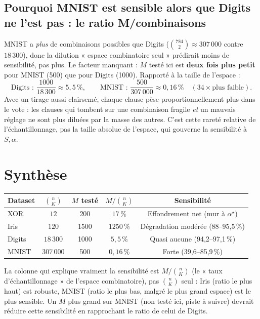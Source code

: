 \documentclass[12pt,a4paper]{article}
\theoremstyle{remark}
\begin{document}
\subsection{Pourquoi MNIST est sensible alors que Digits ne l'est pas : le ratio M/combinaisons}

MNIST a \emph{plus} de combinaisons possibles que Digits
($\binom{784}{2}\approx307\,000$ contre $18\,300$), donc la dilution
« espace combinatoire seul » prédirait moins de sensibilité, pas plus. Le
facteur manquant : $M$ testé ici est \textbf{deux fois plus petit} pour MNIST
(500) que pour Digits (1000). Rapporté à la taille de l'espace :
\[
  \text{Digits : } \frac{1000}{18\,300}\approx5{,}5\,\%,
  \qquad
  \text{MNIST : } \frac{500}{307\,000}\approx0{,}16\,\% \quad (34\times\text{plus faible}).
\]
Avec un tirage aussi clairsemé, chaque clause pèse proportionnellement plus
dans le vote : les clauses qui tombent sur une combinaison fragile \emph{et}
un mauvais réglage ne sont plus diluées par la masse des autres. C'est cette
rareté relative de l'échantillonnage, pas la taille absolue de l'espace, qui
gouverne la sensibilité à $S,\alpha$.

\section{Synthèse}

\begin{center}
\renewcommand{\arraystretch}{1.3}
\begin{tabular}{lcccc}
\toprule
Dataset & $\binom{n}{K}$ & $M$ testé & $M/\binom{n}{K}$ & Sensibilité \\
\midrule
XOR    & $12$      & 200  & $17\,\%$    & Effondrement net (mur à $\alpha^\star$) \\
Iris   & $120$     & 1500 & $1250\,\%$  & Dégradation modérée (88--95,5\,\%) \\
Digits & $18\,300$ & 1000 & $5{,}5\,\%$ & Quasi aucune (94,2--97,1\,\%) \\
MNIST  & $307\,000$& 500  & $0{,}16\,\%$& Forte (39,6--85,9\,\%) \\
\bottomrule
\end{tabular}
\end{center}

La colonne qui explique vraiment la sensibilité est $M/\binom{n}{K}$ (le
« taux d'échantillonnage » de l'espace combinatoire), pas $\binom{n}{K}$ seul :
Iris (ratio le plus haut) est robuste, MNIST (ratio le plus bas, malgré le plus
grand espace) est le plus sensible. Un $M$ plus grand sur MNIST (non testé ici,
piste à suivre) devrait réduire cette sensibilité en rapprochant le ratio de
celui de Digits.
\end{document}
